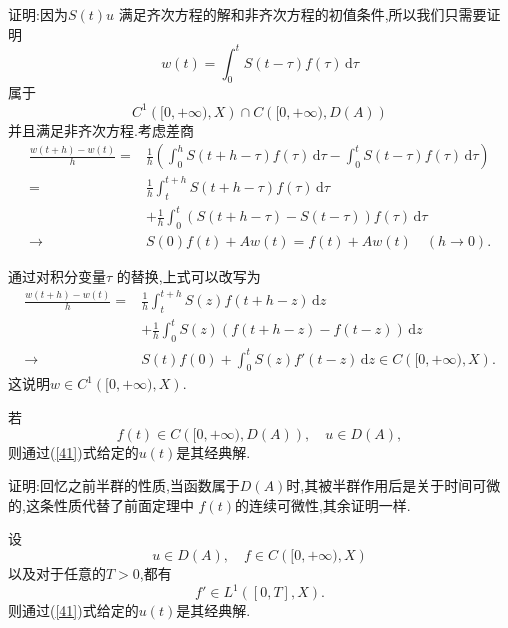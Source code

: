\begin{frame}[t]
  证明:因为$S(t)u$ 满足齐次方程的解和非齐次方程的初值条件,所以我们只需要证明
  \[
    w(t)=\int_0^{t}S(t-\tau )f(\tau )\,\mathrm{d}\tau 
  \] 
  属于
  \[
    C^{1}\left( [0,+\infty),X \right) \cap C\left( [0,+\infty),D(A) \right) 
  \] 
  并且满足非齐次方程.考虑差商
  \begin{equation}
    \begin{aligned}
      \frac{w(t+h)-w(t)}{h}=& \frac{1}{h}\left( \int_0^{h}S(t+h-\tau )f(\tau )\,\mathrm{d}\tau -\int_0^{t}S(t-\tau )f(\tau )\,\mathrm{d}\tau  \right) \\
      = & \frac{1}{h}\int_t ^{t+h}S\left( t+h-\tau  \right) f(\tau )\,\mathrm{d}\tau \\
      &+\frac{1}{h}\int_0^{t}\left( S(t+h-\tau )-S(t-\tau ) \right) f(\tau )\,\mathrm{d}\tau\\
      \to & S(0)f(t)+Aw(t)=f(t)+Aw(t)\quad\left( h\to 0 \right) .
    \end{aligned}
  \end{equation}
\end{frame}

\begin{frame}[t]
  通过对积分变量$\tau $ 的替换,上式可以改写为
  \begin{equation}
    \begin{aligned}
    \frac{w(t+h)-w(t)}{h}=& \frac{1}{h}\int_t ^{t+h}S(z)f(t+h-z)\,\mathrm{d}z\\
    &+\frac{1}{h}\int_0^{t}S(z)\left( f(t+h-z)-f(t-z) \right) \,\mathrm{d}z\\
    \to & S(t) f(0)+\int_0^{t}S(z)f'(t-z)\,\mathrm{d}z\in C\left( [0,+\infty),X \right) .
    \end{aligned}
  \end{equation}
  这说明$w\in C^{1}\left( [0,+\infty),X \right) $.
\end{frame}

\begin{frame}[t]
   \begin{corollary}
    若
    \[
      f(t)\in C\left( [0,+\infty),D(A) \right) , \quad u\in D(A),
    \] 
    则通过{\normalfont(\ref{41})}式给定的$u(t)$是其经典解.
   \end{corollary}
   证明:回忆之前半群的性质,当函数属于$D(A)$时,其被半群作用后是关于时间可微的,这条性质代替了前面定理中 $f(t)$的连续可微性,其余证明一样.
   \begin{corollary}
     设
     \[
       u\in D(A),\quad f\in C\left( [0,+\infty),X \right) 
     \] 
     以及对于任意的$T>0$,都有
      \[
	f' \in L^{1}\left( [0,T],X \right) .
     \] 
     则通过{\normalfont(\ref{41})}式给定的$u(t)$是其经典解.
   \end{corollary}
\end{frame}


